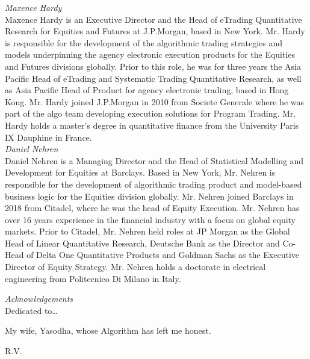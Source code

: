 {\noindent\large\itshape Maxence Hardy} \\[0.2cm]
\noindent Maxence Hardy is an Executive Director and the Head of eTrading Quantitative Research for Equities and Futures at J.P.Morgan, based in New York. Mr. Hardy is responsible for the development of the algorithmic trading strategies and models underpinning the agency electronic execution products for the Equities and Futures divisions globally. Prior to this role, he was for three years the Asia Pacific Head of eTrading and Systematic Trading Quantitative Research, as well as Asia Pacific Head of Product for agency electronic trading, based in Hong Kong. Mr. Hardy joined J.P.Morgan in 2010 from Societe Generale where he was part of the algo team developing execution solutions for Program Trading. Mr. Hardy holds a master's degree in quantitative finance from the University Paris IX Dauphine in France. \\


{\noindent\large\itshape Daniel Nehren} \\[0.2cm]
\noindent Daniel Nehren is a Managing Director and the Head of Statistical Modelling and Development for Equities at Barclays. Based in New York, Mr. Nehren is responsible for the development of algorithmic trading product and model-based business logic for the Equities division globally. Mr. Nehren joined Barclays in 2018 from Citadel, where he was the head of Equity Execution. Mr. Nehren has over 16 years experience in the financial industry with a focus on global equity markets. Prior to Citadel, Mr. Nehren held roles at JP Morgan as the Global Head of Linear Quantitative Research, Deutsche Bank as the Director and Co-Head of Delta One Quantitative Products and Goldman Sachs as the Executive Director of Equity Strategy. Mr. Nehren holds a doctorate in electrical engineering from Politecnico Di Milano in Italy.



\newpage



{\itshape \large Acknowledgements} \\


Dedicated to\dots \\


\begin{minipage}[t]{0.8\textwidth}
	\raggedright
  	My wife, Yasodha, whose Algorithm has left me honest. \par
  	\raggedleft
  	R.V.
\end{minipage} \vspace{1cm}


